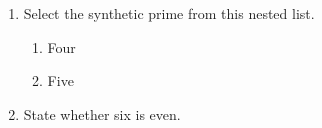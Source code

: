 \begin{enumerate}
\item Select the synthetic prime from this nested list.
  \begin{enumerate}
  \item Four
  \item Five
  \end{enumerate}
\item State whether six is even.
\end{enumerate}
